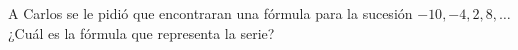 \question[10] A Carlos se le pidió que encontraran una fórmula para la sucesión $-10,-4,2,8, \dots$ 
¿Cu\'al es la f\'ormula que representa la serie? \fillin[$-10+6(n-1)$]
